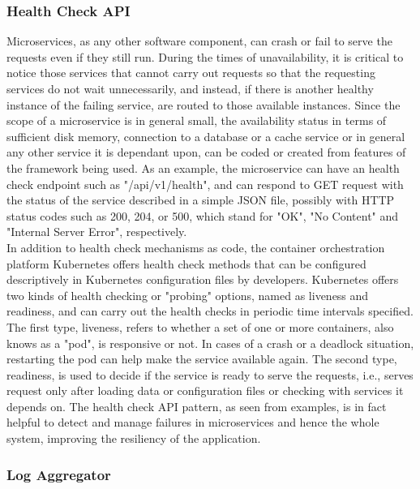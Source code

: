 \documentclass{Configuration_Files/PoliMi3i_thesis}
\begin{document}
\subsubsection{Health Check API}
\label{subsubsec:health_check_api}

Microservices, as any other software component, can crash or fail to serve the requests even if they still run.
During the times of unavailability, it is critical to notice those services that cannot carry out requests so that the requesting services do not wait unnecessarily, and instead, if there is another healthy instance of the failing service, are routed to those available instances.
Since the scope of a microservice is in general small, the availability status in terms of sufficient disk memory, connection to a database or a cache service or in general any other service it is dependant upon, can be coded or created from features of the framework being used.
As an example, the microservice can have an health check endpoint such as "/api/v1/health", and can respond to GET request with the status of the service described in a simple JSON file, possibly with HTTP status codes such as 200, 204, or 500, which stand for "OK", "No Content" and "Internal Server Error", respectively.
\\
In addition to health check mechanisms as code, the container orchestration platform Kubernetes offers health check methods that can be configured descriptively in Kubernetes configuration files by developers.
Kubernetes offers two kinds of health checking or "probing" options, named as liveness and readiness, and can carry out the health checks in periodic time intervals specified.
The first type, liveness, refers to whether a set of one or more containers, also knows as a "pod", is responsive or not.
In cases of a crash or a deadlock situation, restarting the pod can help make the service available again.
The second type, readiness, is used to decide if the service is ready to serve the requests, i.e., serves request only after loading data or configuration files or checking with services it depends on.
The health check API pattern, as seen from examples, is in fact helpful to detect and manage failures in microservices and hence the whole system, improving the resiliency of the application.

\subsubsection{Log Aggregator}
\label{subsubsec:log_aggregator}
\end{document}
